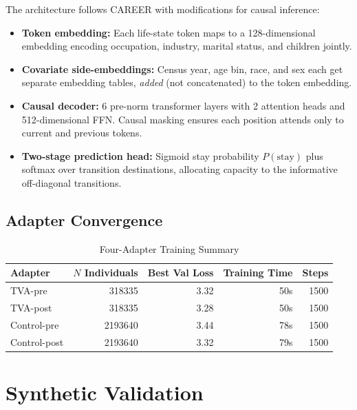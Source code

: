 \documentclass[12pt]{article}
\begin{document}
The architecture follows CAREER \citep{vafa2022} with modifications for causal inference:
\begin{itemize}
    \item \textbf{Token embedding:} Each life-state token maps to a 128-dimensional embedding encoding occupation, industry, marital status, and children jointly.
    \item \textbf{Covariate side-embeddings:} Census year, age bin, race, and sex each get separate embedding tables, \textit{added} (not concatenated) to the token embedding.
    \item \textbf{Causal decoder:} 6 pre-norm transformer layers with 2 attention heads and 512-dimensional FFN. Causal masking ensures each position attends only to current and previous tokens.
    \item \textbf{Two-stage prediction head:} Sigmoid stay probability $P(\text{stay})$ plus softmax over transition destinations, allocating capacity to the informative off-diagonal transitions.
\end{itemize}

\subsection{Adapter Convergence}

\begin{table}[H]
\centering
\caption{Four-Adapter Training Summary}
\label{tab:adapter_training}
\begin{tabular}{lrrrr}
\toprule
Adapter & $N$ Individuals & Best Val Loss & Training Time & Steps \\
\midrule
TVA-pre & \num{318335} & 3.32 & 50s & \num{1500} \\
TVA-post & \num{318335} & 3.28 & 50s & \num{1500} \\
Control-pre & \num{2193640} & 3.44 & 78s & \num{1500} \\
Control-post & \num{2193640} & 3.32 & 79s & \num{1500} \\
\bottomrule
\end{tabular}
\end{table}


\section{Synthetic Validation}
\label{app:validation}
\end{document}
